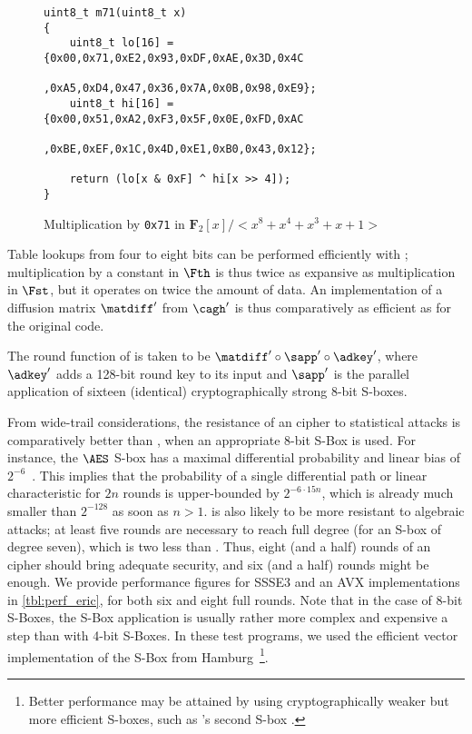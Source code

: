 \begin{figure}[!htb]
\begin{center}
\begin{verbatim}
uint8_t m71(uint8_t x)
{
    uint8_t lo[16] = {0x00,0x71,0xE2,0x93,0xDF,0xAE,0x3D,0x4C
                     ,0xA5,0xD4,0x47,0x36,0x7A,0x0B,0x98,0xE9};
    uint8_t hi[16] = {0x00,0x51,0xA2,0xF3,0x5F,0x0E,0xFD,0xAC
                     ,0xBE,0xEF,0x1C,0x4D,0xE1,0xB0,0x43,0x12};

    return (lo[x & 0xF] ^ hi[x >> 4]);
}
\end{verbatim}
\end{center}
\caption{Multiplication by \texttt{0x71} in $\mathbf{F}_{2}[x]/<x^8+x^4+x^3+x+1>$\label{lst:mulex}}
\end{figure}

Table lookups from four to eight bits can be performed efficiently with \pshufb; multiplication
by a constant in $\Fth$ is thus twice as expansive as multiplication in $\Fst$, but it operates
on twice the amount of data. An implementation of a diffusion matrix
$\matdiff'$ from $\cagh'$ is thus comparatively as efficient as for the original code. 

\medskip 

The round function of \eric is taken to be $\matdiff' \circ \sapp' \circ \adkey'$, where $\adkey'$ adds a
128-bit round key to its input and $\sapp'$ is the parallel application of sixteen (identical) cryptographically
strong 8-bit S-boxes.

From wide-trail considerations, the resistance of an \eric cipher to statistical attacks is comparatively better than \sam,
when an appropriate 8-bit S-Box is used.
For instance, the $\AES$ S-box has a maximal differential probability and linear bias of $2^{-6}$~\cite{aes}.
This implies that the probability of a single differential path or linear characteristic for $2n$ rounds
is upper-bounded by $2^{-6\cdot15 n}$, which is already much smaller than $2^{-128}$ as soon
as $n > 1$.
\eric is also likely to be more resistant to algebraic attacks; at least five rounds are necessary to reach
full degree (for an S-box of degree seven), which is two less than \sam.
Thus, eight (and a half) rounds of an \eric cipher should bring adequate security, and six (and a half) rounds might be enough.
We provide performance figures for SSSE3 and an AVX implementations in \autoref{tbl:perf_eric}, for both six and eight full rounds.
Note that in the case of 8-bit S-Boxes,
the S-Box application is usually rather more complex and expensive a step than with 4-bit S-Boxes. In these test programs, we used the efficient vector
implementation of the \AES{} S-Box from Hamburg~\cite{vpaes}\footnote{Better performance may be attained by using cryptographically
weaker but more efficient S-boxes, such as \whirlpool's second S-box \cite{whirlpool}.}.

